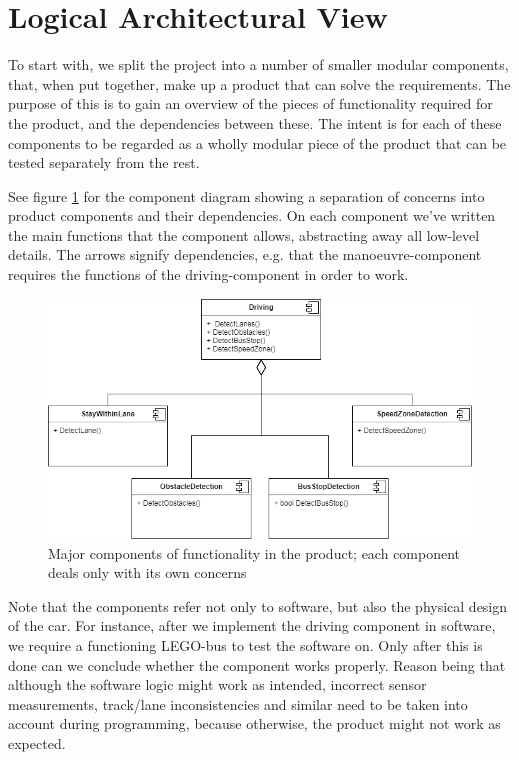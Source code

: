 \section{Logical Architectural View}

To start with, we split the project into a number of smaller modular components, that, when put together, make up a product that can solve the requirements. The purpose of this is to gain an overview of the pieces of functionality required for the product, and the dependencies between these. The intent is for each of these components to be regarded as a wholly modular piece of the product that can be tested separately from the rest. 



See figure \ref{fig:components} for the component diagram showing a separation of concerns into product components and their dependencies. On each component we've written the main functions that the component allows, abstracting away all low-level details. The arrows signify dependencies, e.g. that the manoeuvre-component requires the functions of the driving-component in order to work. 

\begin{figure}[ht]
    \includegraphics[width=\textwidth]{Images/Design/componentDiagram.png}
    \caption{Major components of functionality in the product; each component deals only with its own concerns}
    \label{fig:components}
\end{figure}

Note that the components refer not only to software, but also the physical design of the car. For instance, after we implement the driving component in software, we require a functioning LEGO-bus to test the software on. Only after this is done can we conclude whether the component works properly. Reason being that although the software logic might work as intended, incorrect sensor measurements, track/lane inconsistencies and similar need to be taken into account during programming, because otherwise, the product might not work as expected.

